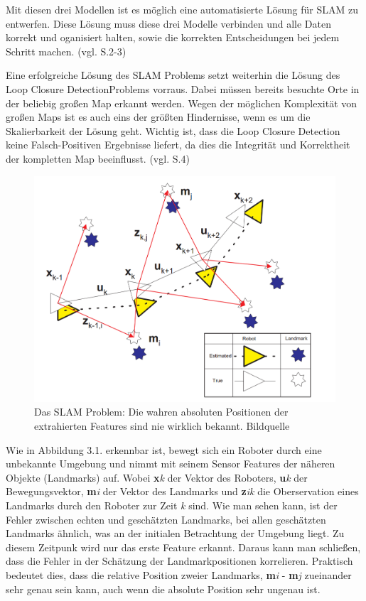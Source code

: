 Mit diesen drei Modellen ist es möglich eine automatisierte Lösung für SLAM zu entwerfen. Diese Lösung muss diese drei Modelle verbinden und alle Daten korrekt und oganisiert halten, sowie die korrekten Entscheidungen bei jedem Schritt machen. (vgl. \cite{ekf_slam} S.2-3)

Eine erfolgreiche Lösung des SLAM Problems setzt weiterhin die Lösung des \glqq Loop Closure Detection\grqq Problems vorraus. Dabei müssen bereits besuchte Orte in der beliebig großen Map erkannt werden. Wegen der möglichen Komplexität von großen Maps ist es auch eins der größten Hindernisse, wenn es um die Skalierbarkeit der Lösung geht. Wichtig ist, dass die Loop Closure Detection keine Falsch-Positiven Ergebnisse liefert, da dies die Integrität und Korrektheit der kompletten Map beeinflusst. (vgl. \cite{ar_slam} S.4)


\begin{figure}[H]
	\centering
	\includegraphics[scale=0.35]{slam_problem.png}
	\caption{Das SLAM Problem: Die wahren absoluten Positionen der extrahierten Features sind nie wirklich bekannt. Bildquelle \cite{slam}}
\end{figure} 

Wie in Abbildung 3.1. erkennbar ist, bewegt sich ein Roboter durch eine unbekannte Umgebung und nimmt mit seinem Sensor Features der näheren Objekte (Landmarks) auf. Wobei \large\textbf{x}\normalsize\textit{k} der Vektor des Roboters,  \large\textbf{u}\normalsize\textit{k} der Bewegungsvektor, \large\textbf{m}\normalsize\textit{i} der Vektor des Landmarks und \large\textbf{z}\normalsize\textit{ik} die Oberservation eines Landmarks durch den Roboter zur Zeit \large\textit{k }\normalsize sind. Wie man sehen kann, ist der Fehler zwischen echten und geschätzten Landmarks, bei allen geschätzten Landmarks ähnlich, was an der initialen Betrachtung der Umgebung liegt. Zu diesem Zeitpunk wird nur das erste Feature erkannt. Daraus kann man schließen, dass die Fehler in der Schätzung der Landmarkpositionen korrelieren. Praktisch bedeutet dies, dass die relative Position zweier Landmarks, \large\textbf{m}\normalsize\textit{i} - \large\textbf{m}\normalsize\textit{j} zueinander sehr genau sein kann, auch wenn die absolute Position sehr ungenau ist. 

